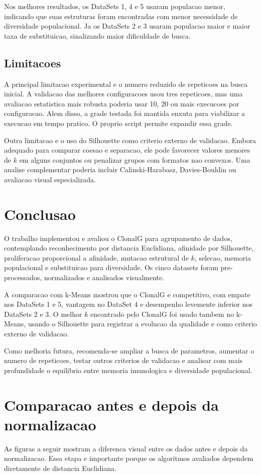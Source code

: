 \documentclass[12pt,a4paper]{article}
\begin{document}
Nos melhores resultados, os DataSets 1, 4 e 5 usaram populacao menor, indicando que suas estruturas foram encontradas com menor necessidade de diversidade populacional. Ja os DataSets 2 e 3 usaram populacao maior e maior taxa de substituicao, sinalizando maior dificuldade de busca.

\subsection{Limitacoes}
A principal limitacao experimental e o numero reduzido de repeticoes na busca inicial. A validacao das melhores configuracoes usou tres repeticoes, mas uma avaliacao estatistica mais robusta poderia usar 10, 20 ou mais execucoes por configuracao. Alem disso, a grade testada foi mantida enxuta para viabilizar a execucao em tempo pratico. O proprio script permite expandir essa grade.

Outra limitacao e o uso do Silhouette como criterio externo de validacao. Embora adequado para comparar coesao e separacao, ele pode favorecer valores menores de \(k\) em alguns conjuntos ou penalizar grupos com formatos nao convexos. Uma analise complementar poderia incluir Calinski-Harabasz, Davies-Bouldin ou avaliacao visual especializada.

\section{Conclusao}
O trabalho implementou e avaliou o ClonalG para agrupamento de dados, contemplando reconhecimento por distancia Euclidiana, afinidade por Silhouette, proliferacao proporcional a afinidade, mutacao estrutural de \(k\), selecao, memoria populacional e substituicao para diversidade. Os cinco datasets foram pre-processados, normalizados e analisados visualmente.

A comparacao com k-Means mostrou que o ClonalG e competitivo, com empate nos DataSets 1 e 5, vantagem no DataSet 4 e desempenho levemente inferior nos DataSets 2 e 3. O melhor \(k\) encontrado pelo ClonalG foi usado tambem no k-Means, usando o Silhouette para registrar a evolucao da qualidade e como criterio externo de validacao.

Como melhoria futura, recomenda-se ampliar a busca de parametros, aumentar o numero de repeticoes, testar outros criterios de validacao e analisar com mais profundidade o equilibrio entre memoria imunologica e diversidade populacional.

\appendix
\section{Comparacao antes e depois da normalizacao}
As figuras a seguir mostram a diferenca visual entre os dados antes e depois da normalizacao. Essa etapa e importante porque os algoritmos avaliados dependem diretamente de distancia Euclidiana.
\end{document}
